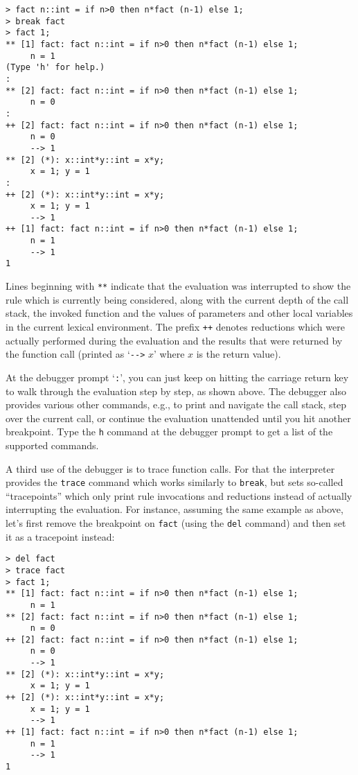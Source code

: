 \documentclass[a4paper,12pt]{article}
\begin{document}
\begin{lstlisting}
> fact n::int = if n>0 then n*fact (n-1) else 1;
> break fact
> fact 1;
** [1] fact: fact n::int = if n>0 then n*fact (n-1) else 1;
     n = 1
(Type 'h' for help.)
:
** [2] fact: fact n::int = if n>0 then n*fact (n-1) else 1;
     n = 0
:
++ [2] fact: fact n::int = if n>0 then n*fact (n-1) else 1;
     n = 0
     --> 1
** [2] (*): x::int*y::int = x*y;
     x = 1; y = 1
:
++ [2] (*): x::int*y::int = x*y;
     x = 1; y = 1
     --> 1
++ [1] fact: fact n::int = if n>0 then n*fact (n-1) else 1;
     n = 1
     --> 1
1
\end{lstlisting}

Lines beginning with \verb|**| indicate that the evaluation was interrupted to show the rule which is currently being considered, along with the current depth of the call stack, the invoked function and the values of parameters and other local variables in the current lexical environment. The prefix \verb|++| denotes reductions which were actually performed during the evaluation and the results that were returned by the function call (printed as `\verb|-->| $x$' where $x$ is the return value).

At the debugger prompt `\verb|:|', you can just keep on hitting the carriage return key to walk through the evaluation step by step, as shown above. The debugger also provides various other commands, e.g., to print and navigate the call stack, step over the current call, or continue the evaluation unattended until you hit another breakpoint. Type the \verb|h| command at the debugger prompt to get a list of the supported commands.

A third use of the debugger is to trace function calls. For that the interpreter provides the \texttt{trace} command which works similarly to \texttt{break}, but sets so-called ``tracepoints'' which only print rule invocations and reductions instead of actually interrupting the evaluation. For instance, assuming the same example as above, let's first remove the breakpoint on \texttt{fact} (using the \texttt{del} command) and then set it as a tracepoint instead:

\begin{lstlisting}
> del fact
> trace fact
> fact 1;
** [1] fact: fact n::int = if n>0 then n*fact (n-1) else 1;
     n = 1
** [2] fact: fact n::int = if n>0 then n*fact (n-1) else 1;
     n = 0
++ [2] fact: fact n::int = if n>0 then n*fact (n-1) else 1;
     n = 0
     --> 1
** [2] (*): x::int*y::int = x*y;
     x = 1; y = 1
++ [2] (*): x::int*y::int = x*y;
     x = 1; y = 1
     --> 1
++ [1] fact: fact n::int = if n>0 then n*fact (n-1) else 1;
     n = 1
     --> 1
1
\end{lstlisting}
\end{document}
